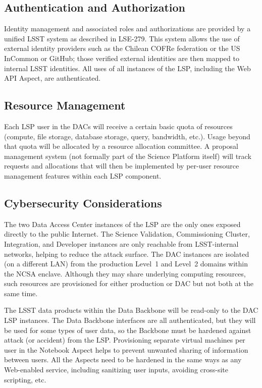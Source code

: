 \subsection{Authentication and Authorization}\label{authentication-and-authorization}

Identity management and associated roles and authorizations are provided by a
unified LSST system as described in LSE-279.  This system allows the use of
external identity providers such as the Chilean COFRe federation \citep{COFRe}
or the US InCommon \citep{InCommon} or GitHub; those verified external
identities are then mapped to internal LSST identities.  All uses of all
instances of the LSP, including the Web API Aspect, are authenticated.

\subsection{Resource Management}\label{resource-management}

Each LSP user in the DACs will receive a certain basic quota of resources
(compute, file storage, database storage, query, bandwidth, etc.).
Usage beyond that quota will be allocated by a resource allocation committee.
A proposal management system (not formally part of the Science Platform itself)
will track requests and allocations that will then be implemented by per-user
resource management features within each LSP component.

\subsection{Cybersecurity Considerations}\label{cybersecurity-considerations}

The two Data Access Center instances of the LSP are the only ones exposed
directly to the public Internet.
The Science Validation, Commissioning Cluster,
Integration, and Developer instances are only reachable from LSST-internal
networks, helping to reduce the attack surface.
The DAC instances are isolated (on a different LAN) from the production
Level~1 and Level~2 domains within the NCSA enclave.
Although they may share underlying computing resources, such
resources are provisioned for either production or DAC but not both at the
same time.

The LSST data products within the Data Backbone will be read-only to the DAC
LSP instances.
The Data Backbone interfaces are all authenticated,
but they will be used for some types of user data, so the Backbone must be
hardened against attack (or accident) from the LSP.
Provisioning separate virtual machines per user in the Notebook Aspect helps
to prevent unwanted sharing of information between users.
All the Aspects
need to be hardened in the same ways as any Web-enabled service, including
sanitizing user inputs, avoiding cross-site scripting, etc.

